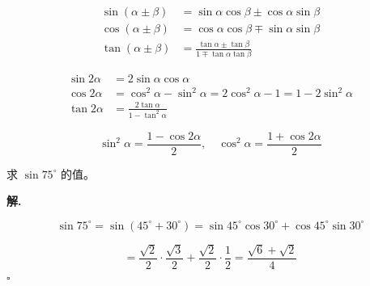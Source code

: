 \begin{theorem}[两角和与差的公式]
\begin{align*}
\sin(\alpha \pm \beta) &= \sin\alpha\cos\beta \pm \cos\alpha\sin\beta \\
\cos(\alpha \pm \beta) &= \cos\alpha\cos\beta \mp \sin\alpha\sin\beta \\
\tan(\alpha \pm \beta) &= \frac{\tan\alpha \pm \tan\beta}{1 \mp \tan\alpha\tan\beta}
\end{align*}
\end{theorem}

\begin{theorem}[二倍角公式]
\begin{align*}
\sin 2\alpha &= 2\sin\alpha\cos\alpha \\
\cos 2\alpha &= \cos^2\alpha - \sin^2\alpha = 2\cos^2\alpha - 1 = 1 - 2\sin^2\alpha \\
\tan 2\alpha &= \frac{2\tan\alpha}{1 - \tan^2\alpha}
\end{align*}
\end{theorem}

\begin{theorem}[降幂公式]
\[ \sin^2\alpha = \frac{1 - \cos 2\alpha}{2}, \quad \cos^2\alpha = \frac{1 + \cos 2\alpha}{2} \]
\end{theorem}

\begin{example}
求 $\sin 75^\circ$ 的值。
\end{example}

\textbf{解.}

\[ \sin 75^\circ = \sin(45^\circ + 30^\circ) = \sin 45^\circ\cos 30^\circ + \cos 45^\circ\sin 30^\circ \]

\[ = \frac{\sqrt{2}}{2} \cdot \frac{\sqrt{3}}{2} + \frac{\sqrt{2}}{2} \cdot \frac{1}{2} = \frac{\sqrt{6} + \sqrt{2}}{4} \]
\hfill $\square$
